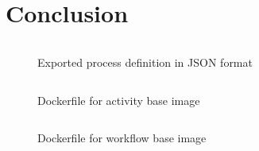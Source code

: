 \documentclass[language=english,noinputenc]{wiwwuwordrprt}
\begin{document}
  \chapter{Conclusion} %
    \label{cha:conclusion}
    

  
  

  \appendix


  \begin{figure}[htbp]
    \inputminted[fontsize=\footnotesize,linenos=true,numberblanklines=true,showspaces=false,breaklines=true,baselinestretch=1]{json}{./content/snippets/process_definition.json}
    \caption{Exported process definition in JSON format}
    \label{fig:exported_process_definition_in_json_format}
  \end{figure}

  \begin{figure}[htbp]
    \inputminted[fontsize=\footnotesize,linenos=true,numberblanklines=true,showspaces=false,breaklines=true,baselinestretch=1]{Dockerfile}{../code/ac_base/Dockerfile}
    \caption{Dockerfile for activity base image}
    \label{fig:dockerfile_for_activity_base_image}
  \end{figure}

  \begin{figure}[htbp]
    \inputminted[fontsize=\footnotesize,linenos=true,numberblanklines=true,showspaces=false,breaklines=true,baselinestretch=1]{Dockerfile}{../code/wf_base/Dockerfile}
    \caption{Dockerfile for workflow base image}
    \label{fig:dockerfile_for_workflow_base_image}
  \end{figure}

\end{document}
